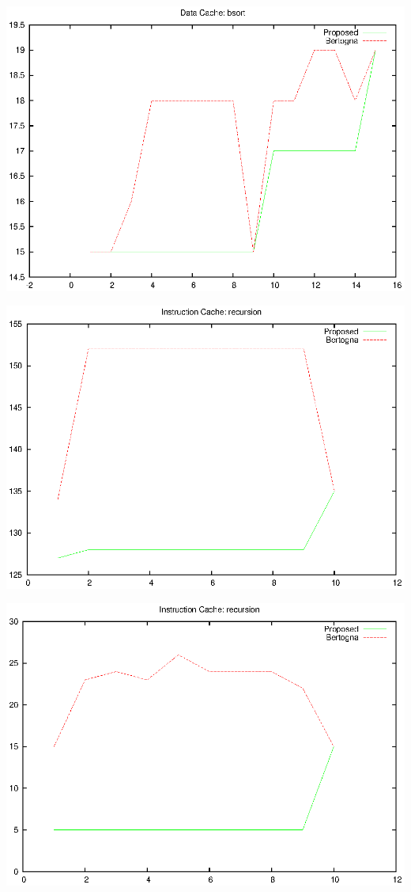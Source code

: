 \documentclass[12pt]{article}
\begin{document}
\includegraphics{eps/bsort-dcache.eps}

\includegraphics{eps/recursion-icache.eps}

\includegraphics{eps/recursion-dcache.eps}
\end{document}
